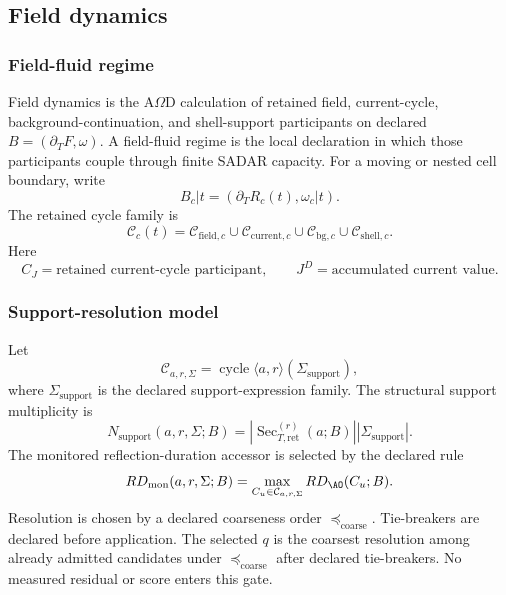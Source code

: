 
\subsection{Field dynamics}
\label{sec:field-dynamics}

\subsubsection{Field-fluid regime}
\label{subsec:field-fluid-regime}
Field dynamics is the A\(\Omega\)D calculation of retained field, current-cycle, background-continuation, and shell-support participants on declared \(B=(\partial_TF,\omega)\). A field-fluid regime is the local declaration in which those participants couple through finite SADAR capacity. For a moving or nested cell boundary, write
\[
B_c|t=(\partial_T R_c(t),\omega_c|t).
\]
The retained cycle family is
\[
\mathcal C_c(t)
=
\mathcal C_{\mathrm{field},c}
\cup
\mathcal C_{\mathrm{current},c}
\cup
\mathcal C_{\mathrm{bg},c}
\cup
\mathcal C_{\mathrm{shell},c}.
\]
Here
\[
C_J=\text{retained current-cycle participant},
\qquad
J^D=\text{accumulated current value}.
\]

\subsubsection{Support-resolution model}
\label{subsec:cycle-beat-resolution-gate}
Let
\[
\mathcal C_{a,r,\Sigma}
=
\operatorname{cycle}\langle a,r\rangle(\Sigma_{\mathrm{support}}),
\]
where \(\Sigma_{\mathrm{support}}\) is the declared support-expression family. The structural support multiplicity is
\[
N_{\mathrm{support}}(a,r,\Sigma;B)
=
\left|\operatorname{Sec}^{(r)}_{T,\mathrm{ret}}(a;B)\right|
\left|\Sigma_{\mathrm{support}}\right|.
\]
The monitored reflection-duration accessor is selected by the declared rule
\[
RD_{\mathrm{mon}}(a,r,\Sigma;B)
=
\max_{C_u\in\mathcal C_{a,r,\Sigma}}
RD_{\AO}(C_u;B).
\]
Resolution is chosen by a declared coarseness order \(\preceq_{\mathrm{coarse}}\). Tie-breakers are declared before application. The selected \(q\) is the coarsest resolution among already admitted candidates under \(\preceq_{\mathrm{coarse}}\) after declared tie-breakers. No measured residual or score enters this gate.

